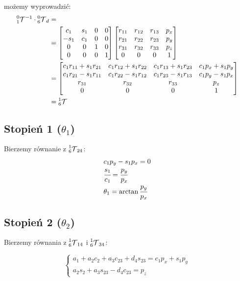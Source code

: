\documentclass[]{article}
\newcommand\T{\mathcal{T}}
\begin{document}
możemy wyprowadzić:
\begin{align*}
\prescript{0}{1}{\T}^{-1} \cdot \prescript{0}{6}{\T}_d &= \\
&= \begin{bmatrix}
c_1 & s_1 & 0 & 0 \\
-s_1 & c_1 & 0 & 0 \\
0 & 0 & 1 & 0 \\
0 & 0 & 0 & 1
\end{bmatrix}\begin{bmatrix}
r_{11} & r_{12} & r_{13} & p_x \\
r_{21} & r_{22} & r_{23} & p_y \\
r_{31} & r_{32} & r_{33} & p_z \\
0 & 0 & 0 & 1
\end{bmatrix} \\
&= \begin{bmatrix}
c_1r_{11} + s_1r_{21} & c_1r_{12} + s_1r_{22} & c_1r_{13} + s_1r_{23} & c_1p_x + s_1p_y \\
c_1r_{21} - s_1r_{11} & c_1r_{22} - s_1r_{12} & c_1r_{23} - s_1r_{13} & c_1p_y - s_1p_x \\
r_{31} & r_{32} & r_{33} & p_z \\
0 & 0 & 0 & 1
\end{bmatrix} \\
&= \prescript{1}{6}{\T}
\end{align*}

\subsection{Stopień 1 ($\theta_1$)}
Bierzemy równanie z $\prescript{1}{6}{\T}_{24}$:
\[\begin{array}{l}
c_1p_y - s_1p_x = 0 \\
\cfrac{s_1}{c_1} = \cfrac{p_y}{p_x} \\
\theta_1 = \arctan \cfrac{p_y}{p_x}
\end{array}\]

\subsection{Stopień 2 ($\theta_2$)}
Bierzemy równania z $\prescript{1}{6}{\T}_{14}$ i $\prescript{1}{6}{\T}_{34}$:

\[\left\{\begin{array}{l}
a_1 + a_2c_2 + a_3c_{23} + d_4s_{23} = c_1p_x + s_1p_y \\
a_2s_2 + a_3s_{23} - d_4c_{23} = p_z
\end{array}\right.\]
\end{document}
